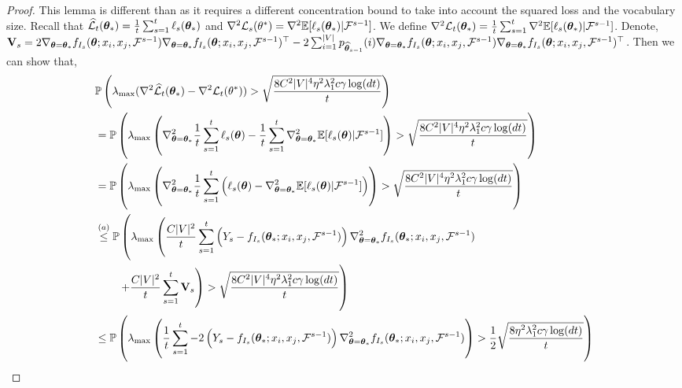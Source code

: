 \begin{proof}
This lemma is different than \citet{frostig2015competing, mukherjee2020generalized} as it requires a different concentration bound to take into account the squared loss  and the vocabulary size.
%
Recall that $ \widehat{\cal L}_t(\bm{\theta}_*) = \frac{1}{t}\sum_{s=1}^t \ell_{s}(\bm{\theta}_*)$ and $\nabla^2 {\cal L}_s(\theta^*) = \nabla^2\mathbb{E}[\ell_{s}(\bm{\theta}_*)|\mathcal{F}^{s-1}]$. We define $\nabla^2 {\cal L}_t(\bm{\theta}_*) = \frac{1}{t}\sum_{s=1}^t\nabla^2\mathbb{E}[\ell_{s}(\bm{\theta}_*)|\mathcal{F}^{s-1}]$. Denote,
    $\mathbf{V}_s = 2\nabla_{\bm{\theta} = \bm{\theta}_*}f_{I_s}(\bm{\theta}; x_i, x_j, \mathcal{F}^{s-1})\nabla_{\bm{\theta} = \bm{\theta}_*}f_{I_s}(\bm{\theta}; x_i, x_j, \mathcal{F}^{s-1})^\top - 2\sum_{i=1}^{|V|} p_{{\widehat{\bm{\theta}}}_{s-1}}(i)\nabla_{\bm{\theta} = \bm{\theta}_*}f_{I_s}(\bm{\theta} ; x_i, x_j, \mathcal{F}^{s-1})\nabla_{\bm{\theta} = \bm{\theta}_*}f_{I_s}(\bm{\theta} ; x_i, x_j, \mathcal{F}^{s-1})^\top$.
Then we can show that,
\begin{align}
    &\Pb\left(\lambda_{\max}(\nabla^2\wLcal_t(\btheta_*) - \nabla^2 \Lcal_t(\theta^*)) > \sqrt{\dfrac{8C^2|V|^4\eta^2\lambda^2_1c\gamma\log(dt)}{t}}\right)\nonumber\\
    &= \Pb\left(\lambda_{\max}\left(\nabla^2_{\btheta=\btheta_*}\frac{1}{t}\sum_{s=1}^t \ell_{s}(\btheta) - \frac{1}{t}\sum_{s=1}^t\nabla^2_{\btheta=\btheta_*} \E[\ell_{s}(\btheta)|\F^{s-1}]\right) > \sqrt{\dfrac{8C^2|V|^4\eta^2\lambda^2_1c\gamma\log(dt)}{t}}\right)\nonumber\\
    &= \Pb\left(\lambda_{\max}\left(\nabla^2_{\btheta=\btheta_*}\frac{1}{t}\sum_{s=1}^t\left( \ell_{s}(\btheta) - \nabla^2_{\btheta=\btheta_*} \E[\ell_{s}(\btheta)|\F^{s-1}]\right)\right) > \sqrt{\dfrac{8C^2|V|^4\eta^2\lambda^2_1c\gamma\log(dt)}{t}}\right)\nonumber\\
    &\overset{(a)}{\leq} \Pb\left(\lambda_{\max}\left(\frac{C|V|^2}{t}\sum_{s=1}^t\left(Y_s - f_{I_s}(\btheta_*; x_i, x_j, \F^{s-1})\right)\nabla^2_{\btheta=\btheta_*}f_{I_s}(\btheta_*; x_i, x_j, \F^{s-1})\right.\right. \nonumber\\
    &\qquad\left.\left. + \frac{C|V|^2}{t}\sum_{s=1}^t \mathbf{V}_s\right) > \sqrt{\dfrac{8C^2|V|^4\eta^2\lambda^2_1c\gamma\log(dt)}{t}}\right)\nonumber\\
    &\leq \Pb\left(\lambda_{\max}\left(\frac{1}{t}\sum_{s=1}^t-2\left(Y_s - f_{I_s}(\btheta_*; x_i, x_j, \F^{s-1})\right)\nabla^2_{\btheta=\btheta_*}f_{I_s}(\btheta_*; x_i, x_j, \F^{s-1})\right) > \frac{1}{2}\sqrt{\dfrac{8\eta^2\lambda^2_1c\gamma\log(dt)}{t}}\right)\nonumber\\

\end{align}
\end{proof}
